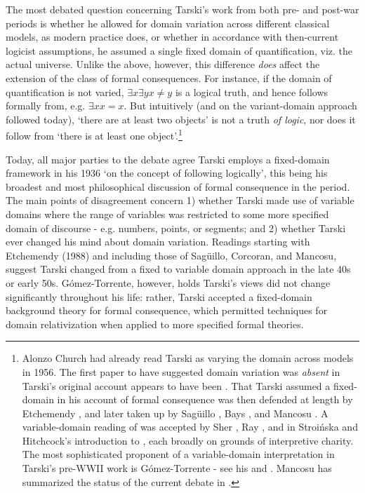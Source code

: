 \documentclass[]{article}
\begin{document}
The most debated question concerning Tarski's work from both pre- and post-war periods is whether he allowed for domain variation across different classical models, as modern practice does, or whether in accordance with then-current logicist assumptions, he assumed a single fixed domain of quantification, viz. the actual universe. Unlike the above, however, this difference \textit{does} affect the extension of the class of formal consequences. For instance, if the domain of quantification is not varied, $\exists x \exists y x \ne y$ is a logical truth, and hence follows formally from, e.g. $\exists x x = x$. But intuitively (and on the variant-domain approach followed today), `there are at least two objects' is not a truth \textit{of logic}, nor does it follow from `there is at least one object'.\footnote{Alonzo Church had already read Tarski as varying the domain across models in 1956. The first paper to have suggested domain variation was \textit{absent} in Tarski's original account appears to have been \cite[p. 43]{Corcoran1972}. That Tarski assumed a fixed-domain in his account of formal consequence was then defended at length by Etchemendy \cite{Etchemendy1988} \cite{Etchemendy1990} \cite{Etchemendy2008}, and later taken up by Sag\"{u}illo \cite{Saguillo1997} \cite{Saguillo2009} \cite{Corcoran2011}, Bays \cite{Bays2001}, and Mancosu \cite{Mancosu2006} \cite{Mancosu2010a}. A variable-domain reading of \cite{Tarski2002} was accepted by Sher \cite{Sher1991} \cite{Sher1996}, Ray \cite{Ray1996}, and in Stroi\'{n}ska and Hitchcock's introduction to \cite{Tarski2002}, each broadly on grounds of interpretive charity. The most sophisticated proponent of a variable-domain interpretation in Tarski's pre-WWII work is G\'{o}mez-Torrente - see his \cite{Gomez-Torrente1996}  and \cite{Gomez-Torrente2009}. Mancosu has summarized the status of the current debate in \cite{Mancosu2010b}.}

Today, all major parties to the debate agree Tarski employs a fixed-domain framework in his 1936 `on the concept of following logically', this being his broadest and most philosophical discussion of formal consequence in the period. The main points of disagreement concern 1) whether Tarski made use of variable domains where the range of variables was restricted to some more specified domain of discourse - e.g. numbers, points, or segments; and 2) whether Tarski ever changed his mind about domain variation. Readings starting with Etchemendy (1988) and including those of Sag\"{u}illo, Corcoran, and Mancosu, suggest Tarski changed from a fixed to variable domain approach in the late 40s or early 50s. G\'{o}mez-Torrente, however, holds Tarski's views did not change significantly throughout his life: rather, Tarski accepted a fixed-domain background theory for formal consequence, which permitted techniques for domain relativization when applied to more specified formal theories.
\end{document}
